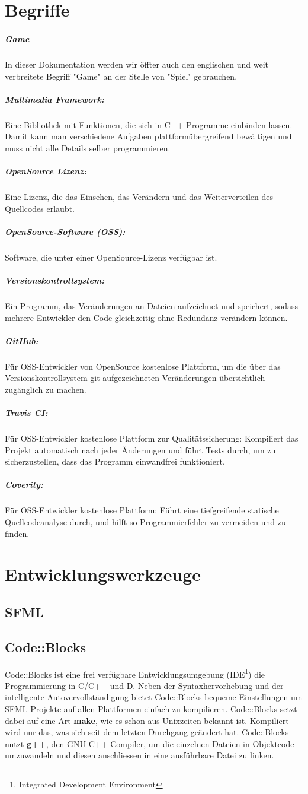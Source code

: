 \documentclass[12pt,a4paper]{scrartcl}
\begin{document}
\newpage
\section{Begriffe}
\subparagraph{Game}
In dieser Dokumentation werden wir öffter auch den englischen und weit verbreitete Begriff "Game" an der Stelle von "Spiel" gebrauchen.

\subparagraph{Multimedia Framework:}
Eine Bibliothek mit Funktionen, die sich in C++-Programme einbinden lassen. Damit kann man verschiedene Aufgaben plattformübergreifend bewältigen und muss nicht alle Details selber programmieren.

\subparagraph{OpenSource Lizenz:}

Eine Lizenz, die das Einsehen, das Verändern und das Weiterverteilen des Quellcodes erlaubt.

\subparagraph{OpenSource-Software (OSS):}
Software, die unter einer OpenSource-Lizenz verfügbar ist.

\subparagraph{Versionskontrollsystem:}
Ein Programm, das Veränderungen an Dateien aufzeichnet und speichert, sodass mehrere Entwickler den Code gleichzeitig ohne Redundanz verändern können.

\subparagraph{GitHub:}
Für OSS-Entwickler von OpenSource kostenlose Plattform, um die über das Versionskontrollsystem git aufgezeichneten Veränderungen übersichtlich zugänglich zu machen.

\subparagraph{Travis CI:}
Für OSS-Entwickler kostenlose Plattform zur Qualitätssicherung: Kompiliert das Projekt automatisch nach jeder Änderungen und führt Tests durch, um zu sicherzustellen, dass das Programm einwandfrei funktioniert.

\subparagraph{Coverity:}
Für OSS-Entwickler kostenlose Plattform: Führt eine tiefgreifende statische Quellcodeanalyse durch, und hilft so Programmierfehler zu vermeiden und zu finden.

\section{Entwicklungswerkzeuge}
\subsection{SFML}

\subsection{Code::Blocks}
Code::Blocks ist eine frei verfügbare Entwicklungsumgebung (IDE\footnote{Integrated Development Environment}) die Programmierung in C/C++ und D.
Neben der Syntaxhervorhebung und der intelligente Autovervollständigung bietet Code::Blocks bequeme Einstellungen um SFML-Projekte auf allen Plattformen
einfach zu kompilieren. Code::Blocks setzt dabei auf eine Art \textbf{make}, wie es schon aus Unixzeiten bekannt ist. Kompiliert wird nur das, was sich
seit dem letzten Durchgang geändert hat. Code::Blocks nutzt \textbf{g++}, den GNU C++ Compiler, um die einzelnen Dateien in Objektcode umzuwandeln und diesen
anschliessen in eine ausführbare Datei zu linken.
\end{document}
